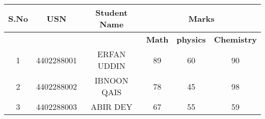 \documentclass{article}
\begin{document}
\begin{tabular}{|c|c|c|c|c|c|}
\hline
\textbf{S.No} & \textbf{USN} & \textbf{Student Name} & \multicolumn{3}{c|}{\textbf{Marks}} \\ \hline
              &              &                       & \textbf{Math} & \textbf{physics} & \textbf{Chemistry} \\ \hline
1             & 4402288001   & ERFAN UDDIN                 & 89                & 60                & 90                \\ \hline
2             & 4402288002   & IBNOON QAIS                 & 78                & 45                & 98                \\ \hline
3             & 4402288003   & ABIR DEY                & 67                & 55                & 59                \\ \hline
\end{tabular}
\end{document}
